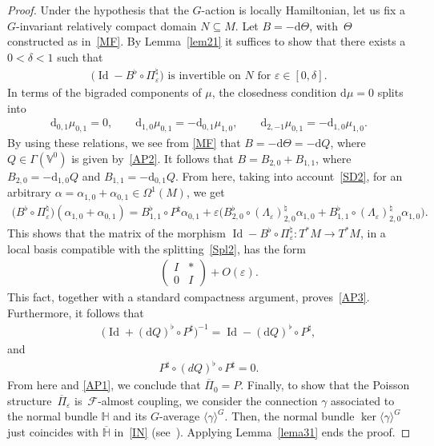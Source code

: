 \documentclass[10pt,a4paper]{amsart}
\numberwithin{equation}{section}
\begin{document}
\begin{proof}
Under the hypothesis that the $G$-action is locally Hamiltonian, let us f\/ix a $G$-invariant relatively compact domain $N\subseteq M$. Let $B=-\mathrm{d}\Theta$, with~$\Theta$ constructed as in~\eqref{MF}. By Lemma~\ref{lem21} it suf\/f\/ices to show that there exists a $0<\delta <1$ such that
\begin{gather}
\big( \operatorname{Id}-B^{\flat}\circ\Pi_{\varepsilon}^{\natural}\big) \mbox{ is invertible on }N\mbox{ for }\varepsilon\in
[0,\delta].\label{AP3}
\end{gather}
In terms of the bigraded components of $\mu$, the closedness condition $\mathrm{d}\mu=0$ splits into
\begin{gather*}
\mathrm{d}_{0,1}\mu_{0,1}=0,\qquad \mathrm{d}_{1,0}\mu_{0,1}=-\mathrm{d}_{0,1}\mu_{1,0},
\qquad \mathrm{d}_{2,-1}\mu_{0,1}=-\mathrm{d}_{1,0}\mu_{1,0}.
\end{gather*}
By using these relations, we see from \eqref{MF} that $B=-\mathrm{d}\Theta=-\mathrm{d}Q$, where $Q\in\Gamma(\mathbb{V}^{0})$ is given by~\eqref{AP2}. It follows that $B=B_{2,0}+B_{1,1}$, where $B_{2,0}=-\mathrm{d}_{1,0}Q$ and $B_{1,1}=-\mathrm{d}_{0,1}Q$. From here, taking into account~\eqref{SD2}, for an arbitrary $\alpha=\alpha_{1,0}+\alpha_{0,1}\in\Omega^{1}(M)$, we get
\begin{gather*}
\big(B^{\flat}\circ\Pi_{\varepsilon}^{\natural}\big)(\alpha_{1,0}+\alpha _{0,1})=B_{1,1}^{\flat}\circ P^{\natural}\alpha_{0,1}+\varepsilon\big(
B_{2,0}^{\flat}\circ(\Lambda_{\varepsilon})_{2,0}^{\natural}\alpha _{1,0}+B_{1,1}^{\flat}\circ(\Lambda_{\varepsilon})_{2,0}^{\natural}\alpha_{1,0}\big) .
\end{gather*}
This shows that the matrix of the morphism $\operatorname{Id}-B^{\flat}\circ\Pi_{\varepsilon}^{\natural}\colon T^{\ast}M\rightarrow T^{\ast}M$, in a local
basis compatible with the splitting~\eqref{Spl2}, has the form
\begin{gather*}
\begin{pmatrix}
I & \ast\\
0 & I
\end{pmatrix}
 +O(\varepsilon).
\end{gather*}
This fact, together with a standard compactness argument, proves~\eqref{AP3}. Furthermore, it follows that
\begin{gather}\label{R1}%
\big(\operatorname{Id}+(\mathrm{d}Q)^{\flat}\circ P^{\sharp}\big)^{-1}=\operatorname{Id}-(\mathrm{d}Q)^{\flat}\circ P^{\sharp},
\end{gather}
and
\begin{gather}\label{R2}
P^{\sharp}\circ(dQ)^{\flat}\circ P^{\sharp}=0.
\end{gather}
From here and \eqref{AP1}, we conclude that $\overline{\Pi}_{0}=P$. Finally, to show that the Poisson structure~$\overline{\Pi}_{\varepsilon}$ is~$\mathcal{F}$-almost coupling, we consider the connection $\gamma$ associated to the normal bundle $\mathbb{H}$ and its $G$-average $ \langle\gamma \rangle^{G}$. Then, the normal bundle $\ker \langle\gamma \rangle^{G}$ just coincides with $\overline{\mathbb{H}}$ in~\eqref{IN} (see~\cite{JVYV-14}). Applying Lemma~\ref{lema31} ends the proof.
\end{proof}
\end{document}
